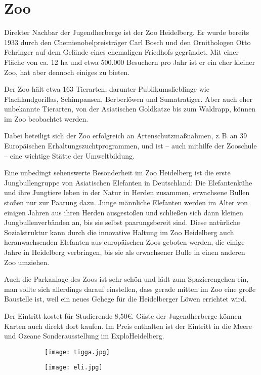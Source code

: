 

\section*{Zoo}

Direkter Nachbar der Jugendherberge ist der Zoo Heidelberg. Er wurde bereits 1933 durch den Chemienobelpreisträger Carl Bosch und den Ornithologen Otto Fehringer auf dem Gelände eines ehemaligen Friedhofs gegründet. Mit einer Fläche von ca. 12 ha und etwa 500.000 Besuchern pro Jahr ist er ein eher kleiner Zoo, hat aber dennoch einiges zu bieten.

Der Zoo hält etwa 163 Tierarten, darunter Publikumslieblinge wie Flachlandgorillas, Schimpansen, Berberlöwen und Sumatratiger. Aber auch eher unbekannte Tierarten, von der Asiatischen Goldkatze bis zum Waldrapp, können im Zoo beobachtet werden.

Dabei beteiligt sich der Zoo erfolgreich an Artenschutzmaßnahmen, z.\,B.\,an 39 Europäischen Erhaltungszuchtprogrammen, und ist -- auch mithilfe der Zooschule -- eine wichtige Stätte der Umweltbildung.

Eine unbedingt sehenswerte Besonderheit im Zoo Heidelberg ist die erste Jungbullengruppe von Asiatischen Elefanten in Deutschland: Die Elefantenkühe und ihre Jungtiere leben in der Natur in Herden zusammen, erwachsene Bullen stoßen nur zur Paarung dazu. Junge männliche Elefanten werden im Alter von einigen Jahren aus ihren Herden ausgestoßen und schließen sich dann kleinen Jungbullenverbänden an, bis sie selbst paarungsbereit sind. Diese natürliche Sozialstruktur kann durch die innovative Haltung im Zoo Heidelberg auch heranwachsenden Elefanten aus europäischen Zoos geboten werden, die einige Jahre in Heidelberg verbringen, bis sie als erwachsener Bulle in einen anderen Zoo umziehen. 

Auch die Parkanlage des Zoos ist sehr schön und lädt zum Spazierengehen ein, man sollte sich allerdings darauf einstellen, dass gerade mitten im Zoo eine große Baustelle ist, weil ein neues Gehege für die Heidelberger Löwen errichtet wird.

Der Eintritt kostet für Studierende 8,50€. Gäste der Jugendherberge können Karten auch direkt dort kaufen. Im Preis enthalten ist der Eintritt in die \glqq Meere und Ozeane\grqq{}  Sonderausstellung im ExploHeidelberg.

\begin{figure}[h]
\captionsetup[subfigure]{labelformat=empty} 
\centering
\begin{subfigure}{0.5\textwidth}
\texttt{[image: tigga.jpg]} 
\end{subfigure}
\begin{subfigure}{0.3\textwidth}
\texttt{[image: eli.jpg]}
\end{subfigure}
\end{figure}